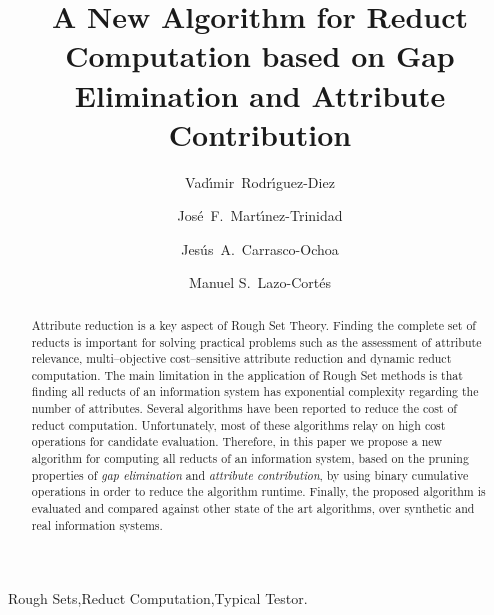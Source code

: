 \documentclass[number,preprint,review,12pt]{elsarticle}
\begin{document}
	\title{A New Algorithm for Reduct Computation based on Gap Elimination and Attribute Contribution}
	
	\author[inaoe,uc]{Vad\'{\i}mir~Rodr\'{\i}guez-Diez}
	\author[inaoe]{Jos\'{e}~F.~Mart\'{\i}nez-Trinidad}
	\author[inaoe]{Jes\'{u}s~A.~Carrasco-Ochoa}	
	\author[inaoe]{Manuel S.~Lazo-Cort\'{e}s}
	\address[inaoe]{Computer Science Department\\
					Instituto Nacional de Astrof\'{\i}sica, \'{O}ptica y Electr\'{o}nica\\
					Luis Enrique Erro \# 1, Santa Mar\'{\i}a Tonantzintla, Puebla, 72840, M\'{e}xico} 
	\address[uc]{Electrical Engineering Department\\
				 Universidad de Camag\"{u}ey\\
				 Circv. Nte. km 5$\frac{1}{2}$, Camag\"{u}ey, Cuba}
	
	\begin{abstract}
		Attribute reduction is a key aspect of Rough Set Theory.  Finding the complete set of reducts is important for solving practical problems such as the assessment of attribute relevance, multi--objective 		cost--sensitive attribute reduction and dynamic reduct computation. The main limitation in the application of Rough Set methods is that finding all reducts of an information system has exponential complexity regarding the number of attributes. Several algorithms have been reported to reduce the cost of reduct computation. Unfortunately, most of these algorithms relay on high cost operations for candidate evaluation. Therefore, in this paper we propose a new algorithm for computing all reducts of an information system, based on the pruning properties of \textit{gap  elimination} and \textit{attribute contribution}, by using binary cumulative operations in order to reduce the algorithm runtime. Finally, the proposed algorithm is evaluated and compared against other state of the art algorithms, over synthetic and real information systems.
	\end{abstract}
	
	\begin{keyword}
		Rough Sets\sep Reduct Computation\sep Typical Testor.
	\end{keyword}

	\maketitle

\end{document}
